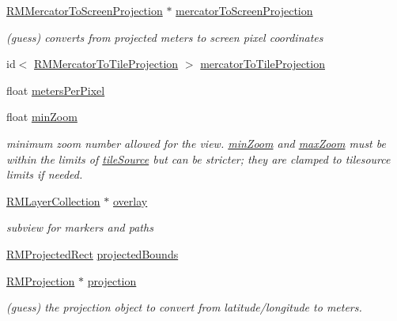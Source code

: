 \begin{DoxyCompactItemize}
\hyperlink{interface_r_m_mercator_to_screen_projection}{R\-M\-Mercator\-To\-Screen\-Projection} $\ast$ \hyperlink{interface_r_m_map_contents_ac90bc80b3d40b418ff2fa21dc35cf6ca}{mercator\-To\-Screen\-Projection}
\begin{DoxyCompactList}\small\item\em (guess) converts from projected meters to screen pixel coordinates \end{DoxyCompactList}\item 
id$<$ \hyperlink{protocol_r_m_mercator_to_tile_projection-p}{R\-M\-Mercator\-To\-Tile\-Projection} $>$ \hyperlink{interface_r_m_map_contents_a3e7903c036affb0241bc13e128574073}{mercator\-To\-Tile\-Projection}
\item 
float \hyperlink{interface_r_m_map_contents_a23204276fe6140d07d3671e9b90157dc}{meters\-Per\-Pixel}
\item 
float \hyperlink{interface_r_m_map_contents_ab434ff9dc95d209ad2d53cf8d0f1703b}{min\-Zoom}
\begin{DoxyCompactList}\small\item\em minimum zoom number allowed for the view. \hyperlink{interface_r_m_map_contents_ab434ff9dc95d209ad2d53cf8d0f1703b}{min\-Zoom} and \hyperlink{interface_r_m_map_contents_afa0fef34433cbc987d0346dccbd151a1}{max\-Zoom} must be within the limits of \hyperlink{interface_r_m_map_contents_afdc2f45aee8bcc5633182450fdea0cfc}{tile\-Source} but can be stricter; they are clamped to tilesource limits if needed. \end{DoxyCompactList}\item 
\hyperlink{interface_r_m_layer_collection}{R\-M\-Layer\-Collection} $\ast$ \hyperlink{interface_r_m_map_contents_ae5474cf3d2df7f969aec0944ac02134c}{overlay}
\begin{DoxyCompactList}\small\item\em subview for markers and paths \end{DoxyCompactList}\item 
\hyperlink{struct_r_m_projected_rect}{R\-M\-Projected\-Rect} \hyperlink{interface_r_m_map_contents_a46afa80adb2b126e05dfaf6501f17eea}{projected\-Bounds}
\item 
\hyperlink{interface_r_m_projection}{R\-M\-Projection} $\ast$ \hyperlink{interface_r_m_map_contents_ac83cbe1542e19defe75afc557007e282}{projection}
\begin{DoxyCompactList}\small\item\em (guess) the projection object to convert from latitude/longitude to meters. \end{DoxyCompactList}\item 

\end{DoxyCompactItemize}
